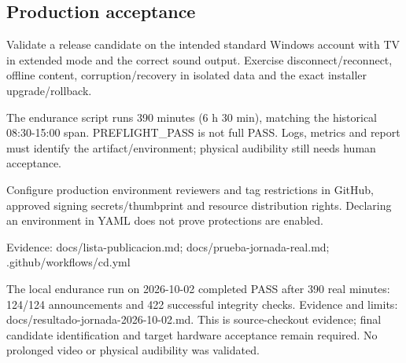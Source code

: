 \subsection{Production acceptance}

Validate a release candidate on the intended standard Windows account with TV in extended mode and the correct sound output. Exercise disconnect/reconnect, offline content, corruption/recovery in isolated data and the exact installer upgrade/rollback.

The endurance script runs 390 minutes (6 h 30 min), matching the historical 08:30-15:00 span. PREFLIGHT\_PASS is not full PASS. Logs, metrics and report must identify the artifact/environment; physical audibility still needs human acceptance.

Configure production environment reviewers and tag restrictions in GitHub, approved signing secrets/thumbprint and resource distribution rights. Declaring an environment in YAML does not prove protections are enabled.

Evidence: docs/lista-publicacion.md; docs/prueba-jornada-real.md; .github/workflows/cd.yml

The local endurance run on 2026-10-02 completed PASS after 390 real minutes: 124/124 announcements and 422 successful integrity checks. Evidence and limits: docs/resultado-jornada-2026-10-02.md. This is source-checkout evidence; final candidate identification and target hardware acceptance remain required. No prolonged video or physical audibility was validated.

